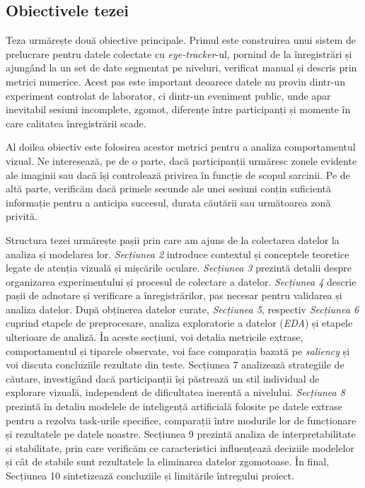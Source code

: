\subsection{Obiectivele tezei}

Teza urmărește două obiective principale. Primul este construirea unui sistem de prelucrare pentru datele colectate cu \emph{eye-tracker}-ul, pornind de la înregistrări și ajungând la un set de date segmentat pe niveluri, verificat manual și descris prin metrici numerice. Acest pas este important deoarece datele nu provin dintr-un experiment controlat de laborator, ci dintr-un eveniment public, unde apar inevitabil sesiuni incomplete, zgomot, diferențe între participanți și momente în care calitatea înregistrării scade.

Al doilea obiectiv este folosirea acestor metrici pentru a analiza comportamentul vizual. Ne interesează, pe de o parte, dacă participanții urmăresc zonele evidente ale imaginii sau dacă își controlează privirea în funcție de scopul sarcinii. Pe de altă parte, verificăm dacă primele secunde ale unei sesiuni conțin suficientă informație pentru a anticipa succesul, durata căutării sau următoarea zonă privită.

Structura tezei urmărește pașii prin care am ajuns de la colectarea datelor la analiza și modelarea lor. \emph{Secțiunea 2} introduce contextul și conceptele teoretice legate de atenția vizuală și mișcările oculare. \emph{Secțiunea 3} prezintă detalii despre organizarea experimentului și procesul de colectare a datelor. \emph{Secțiunea 4} descrie pașii de adnotare și verificare a înregistrărilor, pas necesar pentru validarea și analiza datelor. După obținerea datelor curate, \emph{Secțiunea 5}, respectiv \emph{Secțiunea 6} cuprind etapele de preprocesare, analiza exploratorie a datelor (\emph{EDA}) și etapele ulterioare de analiză. În aceste secțiuni, voi detalia metricile extrase, comportamentul și tiparele observate, voi face comparația bazată pe \emph{saliency} și voi discuta concluziile rezultate din teste. Secțiunea 7 analizează strategiile de căutare, investigând dacă participanții își păstrează un stil individual de explorare vizuală, independent de dificultatea inerentă a nivelului. \emph{Secțiunea 8} prezintă în detaliu modelele de inteligență artificială folosite pe datele extrase pentru a rezolva task-urile specifice, comparații între modurile lor de funcționare și rezultatele pe datele noastre. Secțiunea 9 prezintă analiza de interpretabilitate și stabilitate, prin care verificăm ce caracteristici influențează deciziile modelelor și cât de stabile sunt rezultatele la eliminarea datelor zgomotoase. În final, Secțiunea 10 sintetizează concluziile și limitările întregului proiect.


